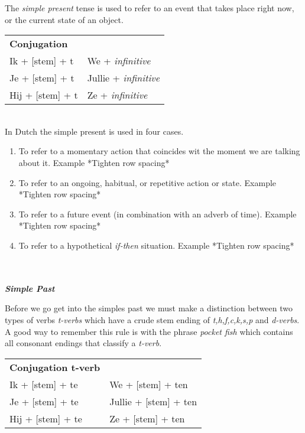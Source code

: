 \documentclass[letterpaper,11pt]{article}
\begin{document}
\par{The \textit{simple present} tense is used to refer to an event that takes place
right now, or the current state of an object.}
\\ 
\begin{tabular}[t]{l l}
    \textbf{Conjugation} \\
    Ik + [stem] + t & We + \textit{infinitive} \\
    Je + [stem] + t & Jullie + \textit{infinitive} \\
    Hij + [stem] + t & Ze + \textit{infinitive} \\
\end{tabular}
\\
In Dutch the simple present is used in four cases.
\begin{enumerate}
    \item To refer to a momentary action that coincides wit the moment we are
        talking about it.
        \subitem Example *Tighten row spacing*
    \item To refer to an ongoing, habitual, or repetitive action or state.
        \subitem Example *Tighten row spacing*
    \item To refer to a future event (in combination with an adverb of time).
        \subitem Example *Tighten row spacing*
    \item To refer to a hypothetical \textit{if-then} situation.
        \subitem Example *Tighten row spacing*
\end{enumerate}
\\ \\
\textbf{\textit{Simple Past}}
\par{Before we go get into the simples past we must make a distinction between two
types of verbs \textit{t-verbs} which have a crude stem ending of
\textit{t,h,f,c,k,s,p} and \textit{d-verbs}. A good way to remember this rule is
with the phrase \textit{pocket fish} which contains all consonant endings that
classify a \textit{t-verb}.}
\\ 
\begin{tabular}[t]{l l}
    \textbf{Conjugation t-verb} \\
    Ik + [stem] + te &  We + [stem] + ten \\
    Je + [stem] + te &  Jullie + [stem] + ten \\
    Hij + [stem] + te & Ze + [stem] + ten \\
\end{tabular}
\end{document}
